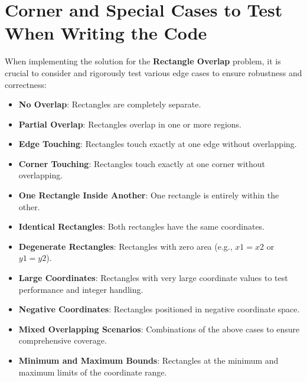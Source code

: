 \section*{Corner and Special Cases to Test When Writing the Code}

When implementing the solution for the \textbf{Rectangle Overlap} problem, it is crucial to consider and rigorously test various edge cases to ensure robustness and correctness:

\begin{itemize}
    \item \textbf{No Overlap}: Rectangles are completely separate.
    
    \item \textbf{Partial Overlap}: Rectangles overlap in one or more regions.
    
    \item \textbf{Edge Touching}: Rectangles touch exactly at one edge without overlapping.
    
    \item \textbf{Corner Touching}: Rectangles touch exactly at one corner without overlapping.
    
    \item \textbf{One Rectangle Inside Another}: One rectangle is entirely within the other.
    
    \item \textbf{Identical Rectangles}: Both rectangles have the same coordinates.
    
    \item \textbf{Degenerate Rectangles}: Rectangles with zero area (e.g., \(x1 = x2\) or \(y1 = y2\)).
    
    \item \textbf{Large Coordinates}: Rectangles with very large coordinate values to test performance and integer handling.
    
    \item \textbf{Negative Coordinates}: Rectangles positioned in negative coordinate space.
    
    \item \textbf{Mixed Overlapping Scenarios}: Combinations of the above cases to ensure comprehensive coverage.
    
    \item \textbf{Minimum and Maximum Bounds}: Rectangles at the minimum and maximum limits of the coordinate range.
\end{itemize}


